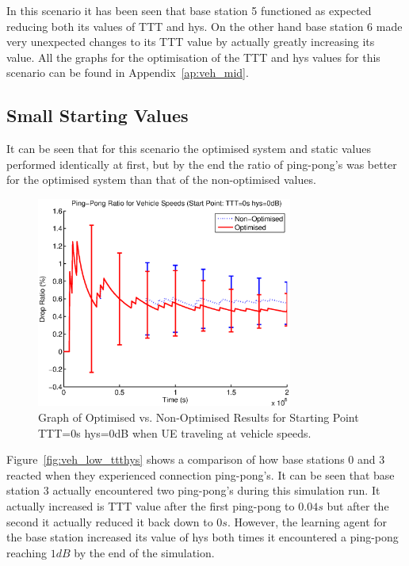 In this scenario it has been seen that base station 5 functioned as expected reducing both its values of TTT and hys. On the other hand base station 6 made very unexpected changes to its TTT value by actually greatly increasing its value. All the graphs for the optimisation of the TTT and hys values for this scenario can be found in Appendix~\ref{ap:veh_mid}.
\subsection{Small Starting Values}
It can be seen that for this scenario the optimised system and static values performed identically at first, but by the end the ratio of ping-pong's was better for the optimised system than that of the non-optimised values.
\begin{figure}[H]
  \begin{center}
    	  \includegraphics[width=0.75\textwidth]{figures/vehicle_figures/vehlow.eps}
    \end{center}
    \caption{Graph of Optimised vs. Non-Optimised Results for Starting Point TTT=0s hys=0dB when UE traveling at vehicle speeds.}
    \label{fig:veh_low_drop}
\end{figure}
Figure~\ref{fig:veh_low_ttthys} shows a comparison of how base stations 0 and 3 reacted when they experienced connection ping-pong’s. It can be seen that base station 3 actually encountered two ping-pong’s during this simulation run. It actually increased is TTT value after the first ping-pong to $0.04 s$ but after the second it actually reduced it back down to $0 s$. However, the learning agent for the base station increased its value of hys both times it encountered a ping-pong reaching $1 dB$ by the end of the simulation.

